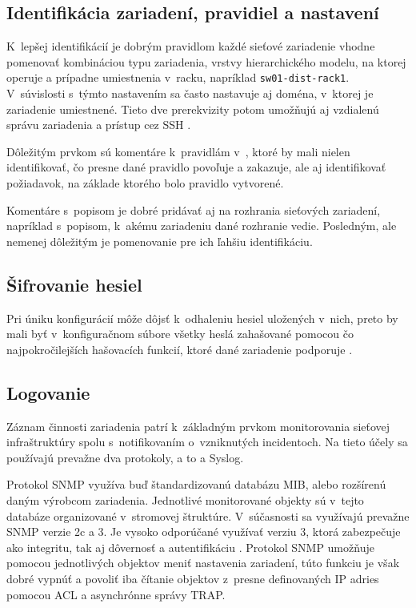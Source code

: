 \subsection{Identifikácia zariadení, pravidiel a nastavení}
K~lepšej identifikácií je dobrým pravidlom každé sieťové zariadenie vhodne pomenovať kombináciou typu zariadenia, vrstvy hierarchického modelu, na ktorej operuje a prípadne umiestnenia v~racku, napríklad \texttt{sw01-dist-rack1}. V~súvislosti s~týmto nastavením sa často nastavuje aj doména, v~ktorej je zariadenie umiestnené. Tieto dve prerekvizity potom umožňujú aj vzdialenú správu zariadenia a prístup cez SSH \cite{CIS_DrTLsgXv24lxeIIM}.

Dôležitým prvkom sú komentáre k~pravidlám v~, ktoré by mali nielen identifikovať, čo presne dané pravidlo povoľuje a zakazuje, ale aj identifikovať požiadavok, na základe ktorého bolo pravidlo vytvorené. 

Komentáre s~popisom je dobré pridávať aj na rozhrania sieťových zariadení, napríklad s~popisom, k~akému zariadeniu dané rozhranie vedie. Posledným, ale nemenej dôležitým je pomenovanie  pre ich ľahšiu identifikáciu.

\subsection{Šifrovanie hesiel}
Pri úniku konfigurácií môže dôjsť k~odhaleniu hesiel uložených v~nich, preto by mali byť v~konfiguračnom súbore všetky heslá zahašované pomocou čo najpokročilejších hašovacích funkcií, ktoré dané zariadenie podporuje \cite{CIS_DrTLsgXv24lxeIIM}.

\subsection{Logovanie}
Záznam činnosti zariadenia patrí k~základným prvkom monitorovania sieťovej infraštruktúry spolu s~notifikovaním o~vzniknutých incidentoch. Na tieto účely sa používajú prevažne dva protokoly, a to  a Syslog. 

Protokol SNMP využíva buď štandardizovanú databázu MIB, alebo rozšírenú daným výrobcom zariadenia. Jednotlivé monitorované objekty sú v~tejto databáze organizované v~stromovej štruktúre. V~súčasnosti sa využívajú prevažne SNMP verzie 2c a 3. Je vysoko odporúčané využívať verziu 3, ktorá zabezpečuje ako integritu, tak aj dôvernosť a autentifikáciu \cite{CIS_DrTLsgXv24lxeIIM}\cite{Graesser2001}. Protokol SNMP umožňuje pomocou jednotlivých objektov meniť nastavenia zariadení, túto funkciu je však dobré vypnúť a povoliť iba čítanie objektov z~presne definovaných IP adries pomocou ACL a asynchrónne správy TRAP.   

